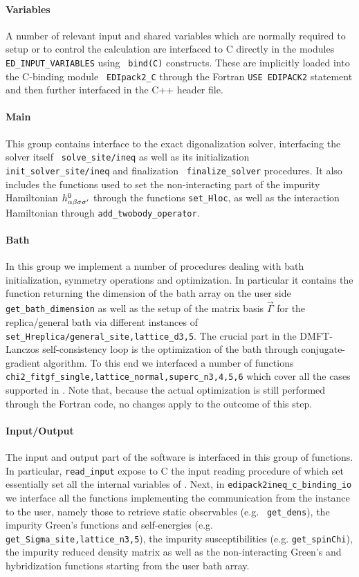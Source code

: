 \documentclass[edipack2.tex]{subfiles}
\begin{document}
\paragraph{{\bf Variables}}
A number of relevant input and shared variables which are normally
required to setup or to control the calculation are interfaced to C
directly in the \NAME modules {\tt ED\_INPUT\_VARIABLES} using {\tt
  bind(C)} constructs. These are implicitly loaded into the C-binding module {\tt
  EDIpack2\_C} through the Fortran {\tt USE EDIPACK2} statement and
then further interfaced in the C++ header file. 


\paragraph{{\bf Main}} This group contains interface to the exact
digonalization solver, interfacing the solver itself {\tt
  solve\_site/ineq} as well as its initialization
{\tt init\_solver\_site/ineq} and finalization {\tt
  finalize\_solver} procedures. It also includes the functions used to
set the non-interacting part of the impurity Hamiltonian
$h^0_{\alpha\beta\sigma\sigma'}$ through the functions {\tt set\_Hloc}, as well as the
interaction Hamiltonian through {\tt add\_twobody\_operator}.


\paragraph{{\bf Bath}} In this group we implement a number of
procedures dealing with bath initialization, symmetry operations and
optimization. In particular it contains the function returning the
dimension of the bath array on the user side {\tt
  get\_bath\_dimension} as well as the setup of the matrix basis
$\vec{\Gamma}$ for the replica/general bath via different instances of
{\tt set\_Hreplica/general\_{site,lattice}\_d{3,5}}. 
The crucial part in the DMFT-Lanczos self-consistency loop is the optimization of the bath
through conjugate-gradient algorithm. To this end we interfaced a
number of functions {\tt
  chi2\_fitgf\_{single,lattice}\_{normal,superc}\_n{3,4,5,6}} which
cover all the cases supported in \NAME. Note that, because the actual
optimization is still performed through the Fortran code, no changes
apply to the outcome of this step.    

\paragraph{{\bf Input/Output}}
The input and output part of the software is interfaced in this group
of functions. In particular, {\tt read\_input} expose to C the input
reading procedure of \NAME which set essentially set all the internal
variables of \NAME.
Next, in {\tt edipack{2ineq}\_c\_binding\_io} we interface all the
functions implementing the communication from the \NAME instance to
the user, namely those to retrieve static observables (e.g. {\tt
  get\_dens}), the impurity Green's functions and self-energies
(e.g. {\tt get\_Sigma\_{site,lattice}\_n{3,5}}), the
impurity susceptibilities (e.g. {\tt get\_spinChi}), the impurity reduced density matrix as well
as the non-interacting Green's and hybridization functions starting from the
user bath array.   
\end{document}
